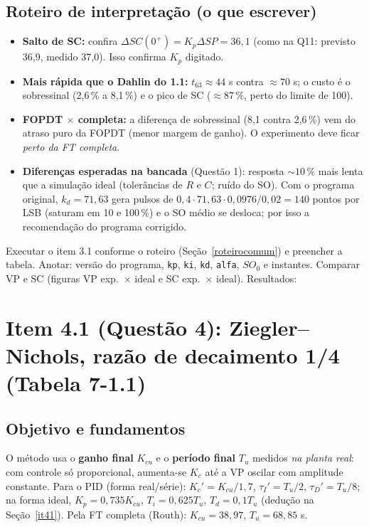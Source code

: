 \subsection{Roteiro de interpretação (o que escrever)}
\begin{itemize}
\item \textbf{Salto de SC:} confira $\Delta SC(0^+)=K_p\Delta SP=36{,}1$ (como na Q11: previsto 36,9, medido 37,0). Isso confirma $K_p$ digitado.
\item \textbf{Mais rápida que o Dahlin do 1.1:} $t_{63}\approx44$ s contra $\approx70$ s; o custo é o sobressinal (2,6\,\% a 8,1\,\%) e o pico de SC ($\approx87\,\%$, perto do limite de 100).
\item \textbf{FOPDT $\times$ completa:} a diferença de sobressinal (8,1 contra 2,6\,\%) vem do atraso puro da FOPDT (menor margem de ganho). O experimento deve ficar \emph{perto da FT completa}.
\item \textbf{Diferenças esperadas na bancada} (Questão 1): resposta $\sim10\,\%$ mais lenta que a simulação ideal (tolerâncias de $R$ e $C$; ruído do SO). Com o programa original, $k_d=71{,}63$ gera pulsos de $0{,}4\cdot71{,}63\cdot0{,}0976/0{,}02=140$ pontos por LSB (saturam em 10 e 100\,\%) e o SO médio se desloca; por isso a recomendação do programa corrigido.
\end{itemize}
\begin{todo}Executar o item 3.1 conforme o roteiro (Seção~\ref{roteirocomum}) e preencher a tabela. Anotar: versão do programa, \texttt{kp}, \texttt{ki}, \texttt{kd}, \texttt{alfa}, $SO_0$ e instantes. Comparar VP e SC (figuras VP exp.\ $\times$ ideal e SC exp.\ $\times$ ideal). Resultados: \underline{\hspace{6cm}}\end{todo}

\section{Item 4.1 (Questão 4): Ziegler--Nichols, razão de decaimento 1/4 (Tabela 7-1.1)}\label{q41exp}
\subsection{Objetivo e fundamentos}
O método usa o \textbf{ganho final} $K_{cu}$ e o \textbf{período final} $T_u$ medidos \emph{na planta real}: com controle só proporcional, aumenta-se $K_c$ até a VP oscilar com amplitude constante. Para o PID (forma real/série): $K_c'=K_{cu}/1{,}7$, $\tau_I'=T_u/2$, $\tau_D'=T_u/8$; na forma ideal, $K_p=0{,}735K_{cu}$, $T_i=0{,}625T_u$, $T_d=0{,}1T_u$ (dedução na Seção~\ref{it41}). Pela FT completa (Routh): $K_{cu}=38{,}97$, $T_u=68{,}85$ s.
